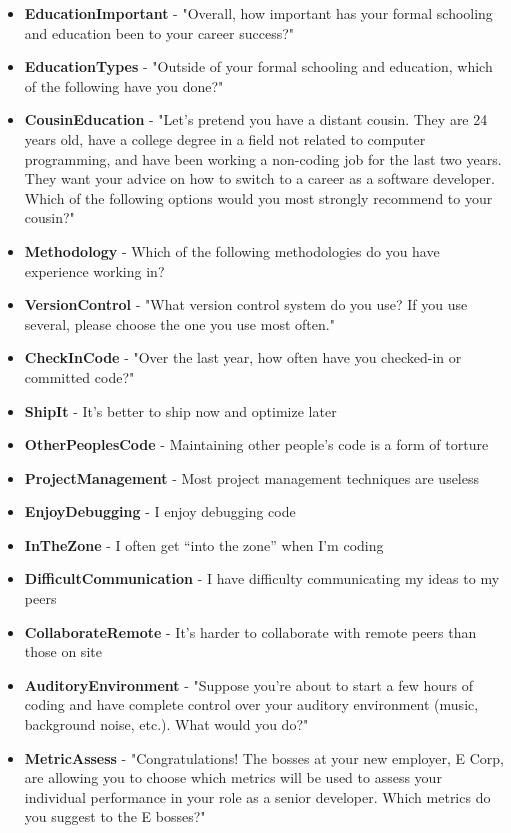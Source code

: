 \begin{appendices}
\begin{itemize}
        \item \textbf{EducationImportant} - "Overall, how important has your formal schooling and education been to your career success?"
        \item \textbf{EducationTypes} - "Outside of your formal schooling and education, which of the following have you done?"
        \item \textbf{CousinEducation} - "Let's pretend you have a distant cousin. They are 24 years old, have a college degree in a field not related to computer programming, and have been working a non-coding job for the last two years. They want your advice on how to switch to a career as a software developer. Which of the following options would you most strongly recommend to your cousin?"
        \item \textbf{Methodology} - Which of the following methodologies do you have experience working in?
        \item \textbf{VersionControl} - "What version control system do you use? If you use several, please choose the one you use most often."
        \item \textbf{CheckInCode} - "Over the last year, how often have you checked-in or committed code?"
        \item \textbf{ShipIt} - It's better to ship now and optimize later
        \item \textbf{OtherPeoplesCode} - Maintaining other people's code is a form of torture
        \item \textbf{ProjectManagement} - Most project management techniques are useless
        \item \textbf{EnjoyDebugging} - I enjoy debugging code
        \item \textbf{InTheZone} - I often get “into the zone” when I'm coding
        \item \textbf{DifficultCommunication} - I have difficulty communicating my ideas to my peers
        \item \textbf{CollaborateRemote} - It's harder to collaborate with remote peers than those on site
        \item \textbf{AuditoryEnvironment} - "Suppose you're about to start a few hours of coding and have complete control over your auditory environment (music, background noise, etc.). What would you do?"
        \item \textbf{MetricAssess} - "Congratulations! The bosses at your new employer, E Corp, are allowing you to choose which metrics will be used to assess your individual performance in your role as a senior developer. Which metrics do you suggest to the E bosses?"

\end{itemize}
\end{appendices}
